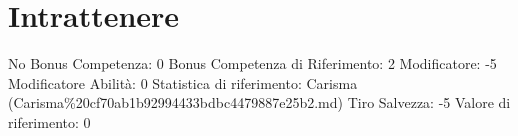 \section{Intrattenere}\label{intrattenere}

\begin{description}
\tightlist
\item[Tags: ABI]
No Bonus Competenza: 0 Bonus Competenza di Riferimento: 2 Modificatore:
-5 Modificatore Abilità: 0 Statistica di riferimento: Carisma
(Carisma\%20cf70ab1b92994433bdbc4479887e25b2.md) Tiro Salvezza: -5
Valore di riferimento: 0
\end{description}
